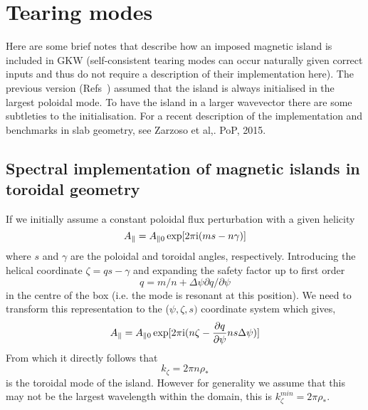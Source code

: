 

\chapter{Tearing modes}

Here are some brief notes that describe how an imposed magnetic island is included in GKW 
(self-consistent tearing modes can occur naturally given correct inputs and thus do not 
require a description of their implementation here). 
The previous version (Refs~\cite{HOR10,HOR10epl}) assumed that the island is always initialised
in the largest poloidal mode.  To have the island in a larger wavevector there are some subtleties to the initialisation.   
For a recent description of the implementation and benchmarks in slab geometry, see 
Zarzoso et al,. PoP, 2015.

\section{Spectral implementation of magnetic islands in toroidal geometry}
If we initially assume a constant poloidal flux perturbation with a given helicity 
\begin{equation} 
A_\parallel = A_{\parallel0} \exp [ 2 \pi {\rm i} (m s - n \gamma ) ] 
\end{equation} 
where $s$ and $\gamma$ are the poloidal and toroidal angles, respectively.  Introducing the helical coordinate $\zeta = qs - \gamma$ and expanding the safety factor up to first order
\begin{equation} 
q = m / n + \Delta\psi\partial q /\partial\psi
\end{equation} 
in the centre of the box (i.e. the mode is resonant at this position). We need to transform this
representation to the ($\psi, \zeta, s)$ coordinate system which gives,
\begin{equation} 
A_\parallel = A_{\parallel0} \exp [ 2 \pi {\rm i} ( n \zeta - {\partial q \over \partial \psi} n s \Delta\psi ) ] 
\end{equation} 
From which it directly follows that 
\begin{equation} 
k_\zeta = 2 \pi n \rho_* 
\end{equation}
is the toroidal mode of the island.  However for generality we assume that this may not be the largest wavelength within the domain, this is $k_\zeta^{min} = 2\pi\rho_*$.

